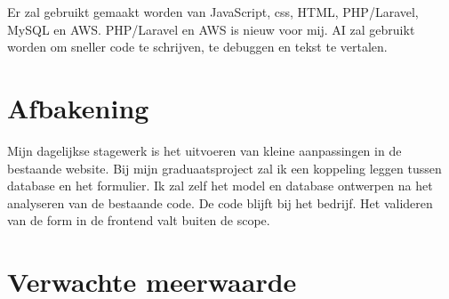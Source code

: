 %
%

Er zal gebruikt gemaakt worden van JavaScript, css, HTML, PHP/Laravel, MySQL en AWS. PHP/Laravel en AWS is nieuw voor mij. AI zal gebruikt worden om sneller code te schrijven, te debuggen en tekst te vertalen.


\section{Afbakening}%
\label{vst:afbakening}

%
%

Mijn dagelijkse stagewerk is het uitvoeren van kleine aanpassingen in de bestaande website. Bij mijn graduaatsproject zal ik een koppeling leggen tussen database en het formulier. Ik zal zelf het model en database ontwerpen na het analyseren van de bestaande code. De code blijft bij het bedrijf. Het valideren van de form in de frontend valt buiten de scope.


\section{Verwachte meerwaarde}%
\label{vst:meerwaarde}



